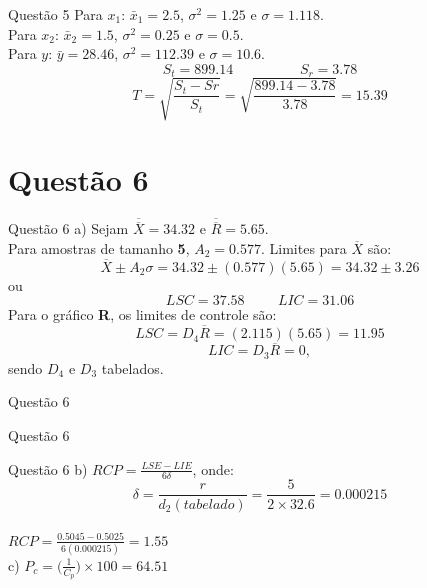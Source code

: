 \documentclass[fleqn]{beamer}\usepackage[]{graphicx}\usepackage[]{color}
\begin{document}
		\begin{frame}{Questão 5}
			Para $x_{1}$:  $\bar{x}_{1} = 2.5$, $\sigma^{2} = 1.25$ e $\sigma = 1.118$.\\
			Para $x_{2}$:  $\bar{x}_{2} = 1.5$, $\sigma^{2} = 0.25$ e $\sigma = 0.5$.\\
			Para $y$:  $\bar{y} = 28.46$, $\sigma^{2} = 112.39$ e $\sigma = 10.6$.
			$$S_{t} = 899.14 \hspace{2cm} S_{r} = 3.78$$
			$$T = \sqrt{\frac{S_{t} - S{r}}{S_{t}}} = \sqrt{\frac{899.14 - 3.78}{3.78}} = 15.39$$			
		\end{frame}
	\section{Questão 6}
		\begin{frame}{Questão 6}
			a)  Sejam $\overline{\overline X} = 34.32$ e $\overline{\overline R} = 5.65$.\\
			Para amostras de tamanho \textbf{5}, $A_{2} = 0.577$.
			Limites para $\overline{X}$ são:
			$$\overline{X} \pm A_{2}\sigma = 34.32 \pm (0.577)(5.65) = 34.32 \pm 3.26$$
			ou
			$$LSC = 37.58\hspace{1cm}LIC = 31.06$$
			Para o gráfico \textbf{R}, os limites de controle são:
			$$LSC = D_{4}\overline{R} = (2.115)(5.65) = 11.95$$
			$$LIC = D_{3}\overline{R} = 0,$$
			sendo $D_{4}$ e $D_{3}$ tabelados.
		\end{frame}
		\begin{frame}{Questão 6}
			\centering
		\end{frame}
		\begin{frame}{Questão 6}
			\centering
		\end{frame}
		\begin{frame}{Questão 6}
			b)  $RCP = \frac{LSE - LIE}{6\delta}$, onde:$$\delta = \frac{r}{d_{2}(tabelado)} = \frac{5}{2\times32.6} = 0.000215$$\\
			$RCP = \frac{0.5045 - 0.5025}{6(0.000215)} = 1.55$\\
			
			c)  $P_{c} = \big(\frac{1}{C_{p}}\big)\times100 = 64.51$
		\end{frame}
\end{document}
